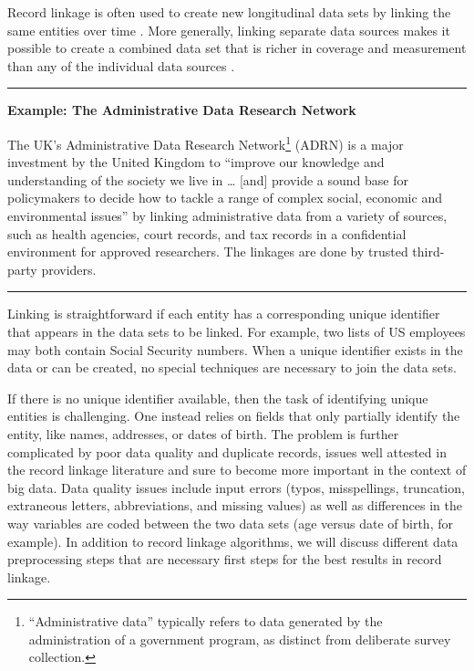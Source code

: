 \documentclass[]{krantz}
\begin{document}
Record linkage is often used to create new longitudinal data sets by
linking the same entities over time \citep{jarmin2002longitudinal}. More
generally, linking separate data sources makes it possible to create a
combined data set that is richer in coverage and measurement than any of
the individual data sources \citep{abowd2004integrated}.

\begin{center}\rule{0.5\linewidth}{\linethickness}\end{center}

\textbf{Example: The Administrative Data Research Network}

The UK's Administrative Data Research Network\footnote{``Administrative
  data'' typically refers to data generated by the administration of a
  government program, as distinct from deliberate survey collection.}
(ADRN) is a major investment by the United Kingdom to ``improve our
knowledge and understanding of the society we live in \ldots{} {[}and{]}
provide a sound base for policymakers to decide how to tackle a range of
complex social, economic and environmental issues'' by linking
administrative data from a variety of sources, such as health agencies,
court records, and tax records in a confidential environment for
approved researchers. The linkages are done by trusted third-party
providers. \citep{EconomicandSocialResearchCouncil2016}

\begin{center}\rule{0.5\linewidth}{\linethickness}\end{center}

Linking is straightforward if each entity has a corresponding unique
identifier that appears in the data sets to be linked. For example, two
lists of US employees may both contain Social Security numbers. When a
unique identifier exists in the data or can be created, no special
techniques are necessary to join the data sets.

If there is no unique identifier available, then the task of identifying
unique entities is challenging. One instead relies on fields that only
partially identify the entity, like names, addresses, or dates of birth.
The problem is further complicated by poor data quality and duplicate
records, issues well attested in the record linkage literature
\citep{christen2012survey} and sure to become more important in the
context of big data. Data quality issues include input errors (typos,
misspellings, truncation, extraneous letters, abbreviations, and missing
values) as well as differences in the way variables are coded between
the two data sets (age versus date of birth, for example). In addition
to record linkage algorithms, we will discuss different data
preprocessing steps that are necessary first steps for the best results
in record linkage.
\end{document}

